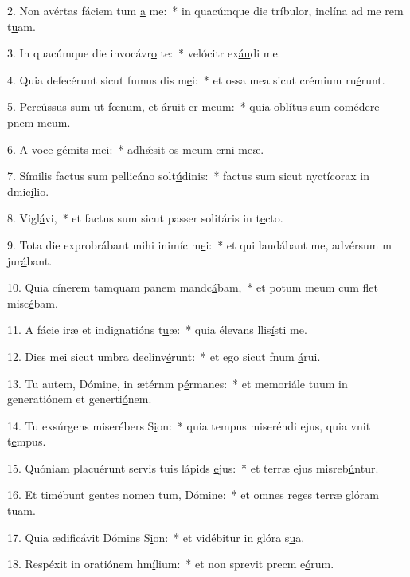 2. Non avértas fáciem tum \uline{a} me:~* in quacúmque die tríbulor, inclína ad me rem t\uline{u}am.\par 
3. In quacúmque die invocávr\uline{o} te:~* velócitr ex\uline{áu}di me.\par 
4. Quia defecérunt sicut fumus dis m\uline{e}i:~* et ossa mea sicut crémium ru\uline{é}runt.\par 
5. Percússus sum ut fœnum, et áruit cr m\uline{e}um:~* quia oblítus sum comédere pnem m\uline{e}um.\par 
6. A voce gémits m\uline{e}i:~* adhǽsit os meum crni m\uline{e}æ.\par 
7. Símilis factus sum pellicáno solt\uline{ú}dinis:~* factus sum sicut nyctícorax in dmic\uline{í}lio.\par 
8. Vigl\uline{á}vi,~* et factus sum sicut passer solitáris in t\uline{e}cto.\par 
9. Tota die exprobrábant mihi inimíc m\uline{e}i:~* et qui laudábant me, advérsum m jur\uline{á}bant.\par 
10. Quia cínerem tamquam panem mandc\uline{á}bam,~* et potum meum cum flet misc\uline{é}bam.\par 
11. A fácie iræ et indignatións t\uline{u}æ:~* quia élevans llis\uline{í}sti me.\par 
12. Dies mei sicut umbra declinv\uline{é}runt:~* et ego sicut fnum \uline{á}rui.\par 
13. Tu autem, Dómine, in ætérnm p\uline{é}rmanes:~* et memoriále tuum in generatiónem et generti\uline{ó}nem.\par 
14. Tu exsúrgens miserébers S\uline{i}on:~* quia tempus miseréndi ejus, quia vnit t\uline{e}mpus.\par 
15. Quóniam placuérunt servis tuis lápids \uline{e}jus:~* et terræ ejus misreb\uline{ú}ntur.\par 
16. Et timébunt gentes nomen tum, D\uline{ó}mine:~* et omnes reges terræ glóram t\uline{u}am.\par 
17. Quia ædificávit Dómins S\uline{i}on:~* et vidébitur in glóra s\uline{u}a.\par 
18. Respéxit in oratiónem hm\uline{í}lium:~* et non sprevit precm e\uline{ó}rum.\par 
